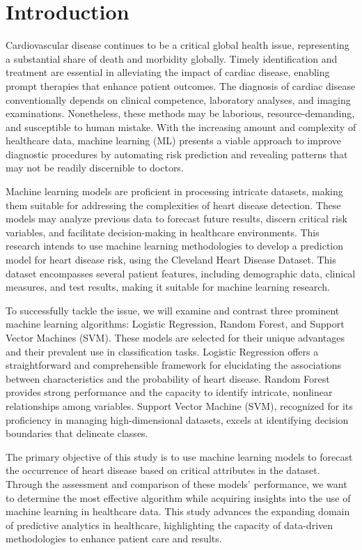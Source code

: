 
\section{Introduction}
Cardiovascular disease continues to be a critical global health issue, representing a substantial share of death and morbidity globally. Timely identification and treatment are essential in alleviating the impact of cardiac disease, enabling prompt therapies that enhance patient outcomes. The diagnosis of cardiac disease conventionally depends on clinical competence, laboratory analyses, and imaging examinations. Nonetheless, these methods may be laborious, resource-demanding, and susceptible to human mistake. With the increasing amount and complexity of healthcare data, machine learning (ML) presents a viable approach to improve diagnostic procedures by automating risk prediction and revealing patterns that may not be readily discernible to doctors.

Machine learning models are proficient in processing intricate datasets, making them suitable for addressing the complexities of heart disease detection. These models may analyze previous data to forecast future results, discern critical risk variables, and facilitate decision-making in healthcare environments. This research intends to use machine learning methodologies to develop a prediction model for heart disease risk, using the Cleveland Heart Disease Dataset. This dataset encompasses several patient features, including demographic data, clinical measures, and test results, making it suitable for machine learning research.

To successfully tackle the issue, we will examine and contrast three prominent machine learning algorithms: Logistic Regression, Random Forest, and Support Vector Machines (SVM). These models are selected for their unique advantages and their prevalent use in classification tasks. Logistic Regression offers a straightforward and comprehensible framework for elucidating the associations between characteristics and the probability of heart disease. Random Forest provides strong performance and the capacity to identify intricate, nonlinear relationships among variables. Support Vector Machine (SVM), recognized for its proficiency in managing high-dimensional datasets, excels at identifying decision boundaries that delineate classes.

The primary objective of this study is to use machine learning models to forecast the occurrence of heart disease based on critical attributes in the dataset. Through the assessment and comparison of these models' performance, we want to determine the most effective algorithm while acquiring insights into the use of machine learning in healthcare data. This study advances the expanding domain of predictive analytics in healthcare, highlighting the capacity of data-driven methodologies to enhance patient care and results.
